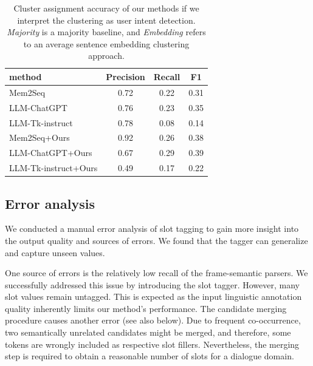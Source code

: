 \begin{table}[tp]
    \centering
    \small
    \begin{tabular}{lccc}
    \hline
     \textbf{method} & \textbf{Precision} & \textbf{Recall} & \textbf{F1} \\
     \hline
     Mem2Seq & 0.72 & 0.22 & 0.31 \\
     LLM-ChatGPT & 0.76 & 0.23 & 0.35 \\
     LLM-Tk-instruct & 0.78 & 0.08 & 0.14 \\
     Mem2Seq+Ours & 0.92 & 0.26 & 0.38 \\
     LLM-ChatGPT+Ours & 0.67 & 0.29 & 0.39 \\
     LLM-Tk-instruct+Ours & 0.49 & 0.17 & 0.22 \\
     
     \hline
    \end{tabular}
    
    \caption{Cluster assignment accuracy of our methods if we interpret the clustering as user intent detection. \textit{Majority} is a majority baseline, and \textit{Embedding} refers to an average sentence embedding clustering approach.
    }
    \label{04:tab:unsup-discovery}
\end{table}


\subsection{Error analysis}
We conducted a manual error analysis of slot tagging to gain more insight into the output quality and sources of errors.
We found that the tagger can generalize and capture unseen values.

One source of errors is the relatively low recall of the frame-semantic parsers.
We successfully addressed this issue by introducing the slot tagger.
However, many slot values remain untagged.
This is expected as the input linguistic annotation quality inherently limits our method's performance.
The candidate merging procedure causes another error (see also below).
Due to frequent co-occurrence, two semantically unrelated candidates might be merged, and therefore, some tokens are wrongly included as respective slot fillers.
Nevertheless, the merging step is required to obtain a reasonable number of slots for a dialogue domain.

